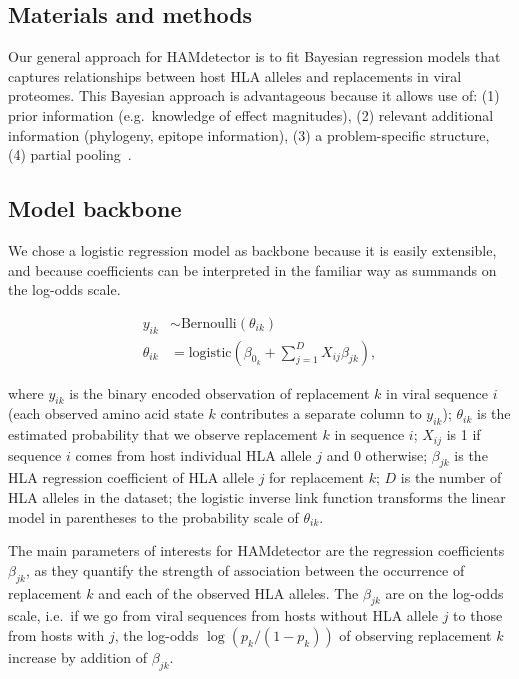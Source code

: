 \documentclass{bioinfo}
\begin{document}
\begin{methods}
  \section{Materials and methods}

  Our general approach for HAMdetector is to fit Bayesian regression models that captures relationships between host HLA alleles and replacements in viral proteomes. This Bayesian approach is advantageous because it allows use of: (1) prior information (e.g.\ knowledge of effect magnitudes), (2) relevant additional information (phylogeny, epitope information), (3) a problem-specific structure, (4) partial pooling~\citep{Gelman2010}.
  
\subsection{Model backbone}

We chose a logistic regression model as backbone because it is easily extensible, and because coefficients can be interpreted in the familiar way as summands on the log-odds scale.

\begin{align}
\label{eq:backbone}
  y_{ik} & \sim \text{Bernoulli}(\theta_{ik}) \\
  \theta_{ik} & = \text{logistic}\left(\beta_{0_{k}} + \sum_{j=1}^{D} X_{ij}\beta_{jk}\right),
\end{align}

where \(y_{ik}\) is the binary encoded observation of replacement $k$ in viral sequence $i$ (each observed amino acid state $k$ contributes a separate column to $y_{ik}$); \(\theta_{ik}\) is the estimated probability that we observe replacement \(k\) in sequence \(i\); \(X_{ij}\) is 1 if sequence \(i\) comes from host individual HLA allele \(j\) and 0 otherwise; $\beta_{jk}$ is the HLA regression coefficient of HLA allele \(j\) for replacement \(k\); \(D\) is the number of HLA alleles in the dataset; the logistic inverse link function transforms the linear model in parentheses to the probability scale of $\theta_{ik}$.

The main parameters of interests for HAMdetector are the regression coefficients $\beta_{jk}$, as they quantify the strength of association between the occurrence of replacement \(k\) and each of the observed HLA alleles. The $\beta_{jk}$ are on the log-odds scale, i.e.\ if we go from viral sequences from hosts without HLA allele $j$ to those from hosts with $j$, the log-odds $\log (p_k/(1-p_k))$ of observing replacement \(k\) increase by addition of $\beta_{jk}$.


\end{methods}
\end{document}
